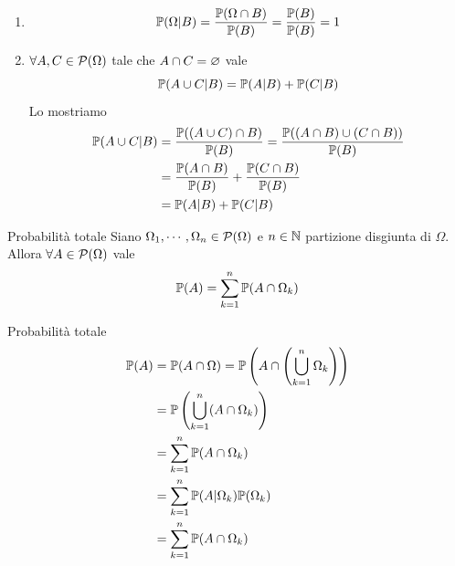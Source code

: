 \documentclass[a4paper]{article}
\begin{document}
\begin{snippetproof}{}
    \begin{enumerate}
        \item \[
                \mathbb P(\Omega | B) = \frac{
                    \mathbb P(\Omega \cap B)
                }{\mathbb P(B)}
                = \frac{\mathbb P(B)}{\mathbb P(B)} = 1
            \]
        \item \(\forall A, C \in \mathcal P(\Omega)\) tale che
            \(A \cap C = \varnothing\) vale \[
                \mathbb P(A \cup C | B) =
                \mathbb P(A | B) + \mathbb P(C | B)
            \]
            Lo mostriamo
            \begin{align*}
                \mathbb P(A \cup C | B)
                &= \frac{
                    \mathbb P((A \cup C) \cap B)
                }{
                    \mathbb P(B)
                }
                = \frac{
                    \mathbb P((A \cap B) \cup (C \cap B))
                }{
                    \mathbb P(B)
                } \\
                &= \frac{
                    \mathbb P(A \cap B)
                }{
                    \mathbb P(B)
                } + \frac{
                    \mathbb P(C \cap B)
                }{
                    \mathbb P(B)
                } \\
                &= \mathbb P(A | B) + \mathbb P(C | B)
            \end{align*}
    \end{enumerate}
\end{snippetproof}

\begin{snippettheorem}{Probabilità totale}
    Siano \(\Omega_1, \cdots, \Omega_n \in \mathcal P(\Omega)\) e \(n \in \mathbb{N}\)
    partizione disgiunta di \(\Omega\).
    Allora \(\forall A \in \mathcal P(\Omega)\) vale
    \[
        \mathbb P(A) = \sum_{k=1}^n \mathbb P(A \cap \Omega_k)
    \]
\end{snippettheorem}

\begin{snippetproof}{Probabilità totale}
    \begin{align*}
        \mathbb P(A) &= \mathbb P(A \cap \Omega) = \mathbb P\left(
            A \cap \left(
                \bigcup_{k=1}^n \Omega_k
            \right)
        \right) \\
        &= \mathbb P\left(
            \bigcup_{k=1}^n (A \cap \Omega_k)
        \right) \\
        &= \sum_{k=1}^n \mathbb P(A \cap \Omega_k) \\
        &= \sum_{k=1}^n \mathbb P(A | \Omega_k) \mathbb P(\Omega_k) \\
        &= \sum_{k=1}^n \mathbb P(A \cap \Omega_k)
    \end{align*}
\end{snippetproof}
\end{document}
